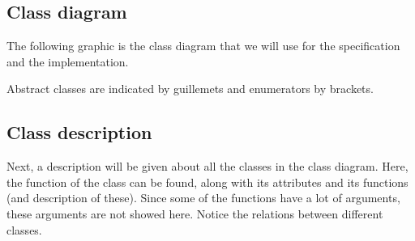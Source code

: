 \subsection{Class diagram}
	The following graphic is the class diagram that we will use for the specification and the implementation.

	
    Abstract classes are indicated by guillemets and enumerators by brackets.

\subsection{Class description}
    Next, a description will be given about all the classes in the class diagram. Here, the function of the class can be found, along with its attributes and its functions (and description of these). Since some of the functions have a lot of arguments, these arguments are not showed here. Notice the relations between different classes.

